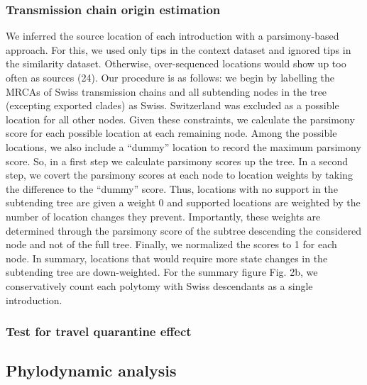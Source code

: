 \documentclass[9pt,twocolumn,twoside,lineno]{pnas-new}
\begin{document}
\subsubsection{Transmission chain origin estimation}
We inferred the source location of each introduction with a parsimony-based approach. For this, we used only tips in the context dataset and ignored tips in the similarity dataset. Otherwise, over-sequenced locations would show up too often as sources (24). Our procedure is as follows: we begin by labelling the MRCAs of Swiss transmission chains and all subtending nodes in the tree (excepting exported clades) as Swiss. Switzerland was excluded as a possible location for all other nodes. Given these constraints, we calculate the parsimony score for each possible location at each remaining node. Among the possible locations, we also include a “dummy” location to record the maximum parsimony score. So, in a first step we calculate parsimony scores up the tree. In a second step, we covert the parsimony scores at each node to location weights by taking the difference to the “dummy” score. Thus, locations with no support in the subtending tree are given a weight 0 and supported locations are weighted by the number of location changes they prevent. Importantly, these weights are determined through the parsimony score of the subtree descending the considered node and not of the full tree. Finally, we normalized the scores to 1 for each node. In summary, locations that would require more state changes in the subtending tree are down-weighted. For the summary figure Fig. 2b, we conservatively count each polytomy with Swiss descendants as a single introduction.

\subsubsection{Test for travel quarantine effect}

\subsection{Phylodynamic analysis}
\end{document}
